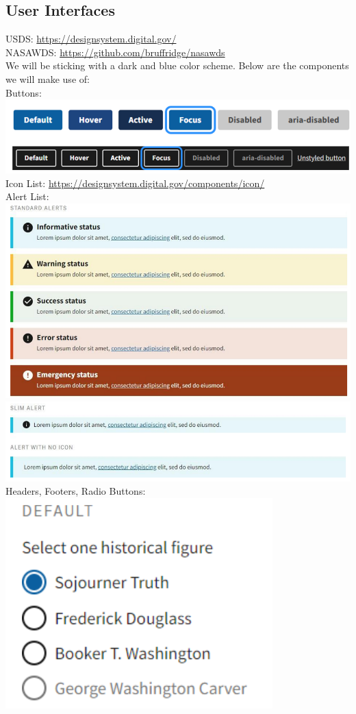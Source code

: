 \documentclass{article}
\begin{document}
\subsection{User Interfaces}
USDS: \href{https://designsystem.digital.gov/}{https://designsystem.digital.gov/} \\
NASAWDS: \href{https://github.com/bruffridge/nasawds}{https://github.com/bruffridge/nasawds} \\
We will be sticking with a dark and blue color scheme. Below are the components we will make use of: \\
Buttons: \\
\includegraphics{buttons} \\
Icon List: \href{https://designsystem.digital.gov/components/icon/}{https://designsystem.digital.gov/components/icon/} \\
Alert List: \\
\includegraphics{alerts_1} \\
\includegraphics{alerts_2} \\
Headers, Footers, Radio Buttons: \\
\includegraphics{headers} \\
\end{document}
